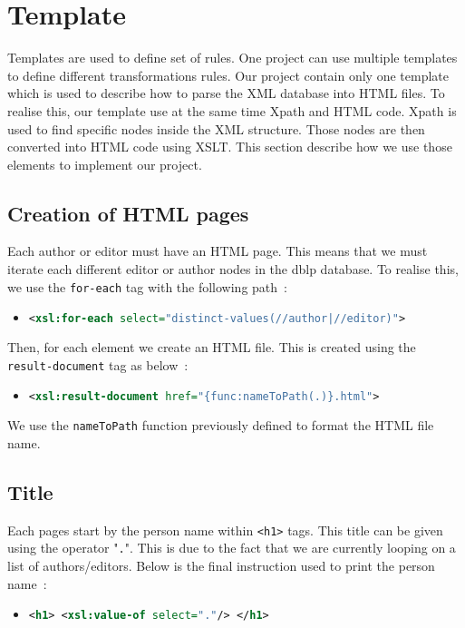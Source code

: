 \documentclass{article}
\begin{document}
\section{Template}
  Templates are used to define set of rules. One project can use multiple templates to define different transformations rules. Our project contain only one template which is used to describe how to parse the XML database into HTML files. To realise this, our template use at the same time Xpath and HTML code. Xpath is used to find specific nodes inside the XML structure. Those nodes are then converted into HTML code using XSLT. This section describe how we use those elements to implement our project.

  \subsection{Creation of HTML pages} 
    Each author or editor must have an HTML page. This means that we must iterate each different editor or author nodes in the dblp database. To realise this, we use the \verb|for-each| tag with the following path~:
    \begin{itemize}
      \item \begin{lstlisting}[language=XML]
<xsl:for-each select="distinct-values(//author|//editor)">\end{lstlisting}
    \end{itemize}
    Then, for each element we create an HTML file. This is created using the \verb|result-document| tag as below~:
    \begin{itemize}
      \item \begin{lstlisting}[language=XML]
<xsl:result-document href="{func:nameToPath(.)}.html">\end{lstlisting}
    \end{itemize}
    We use the \verb|nameToPath| function previously defined to format the HTML file name.

  \subsection{Title}
    Each pages start by the person name within \verb|<h1>| tags. This title can be given using the operator "\verb|.|". This is due to the fact that we are currently looping on a list of authors/editors. Below is the final instruction used to print the person name~:
    \begin{itemize}
      \item \begin{lstlisting}[language=XML]
<h1> <xsl:value-of select="."/> </h1>\end{lstlisting}
    \end{itemize}
\end{document}
